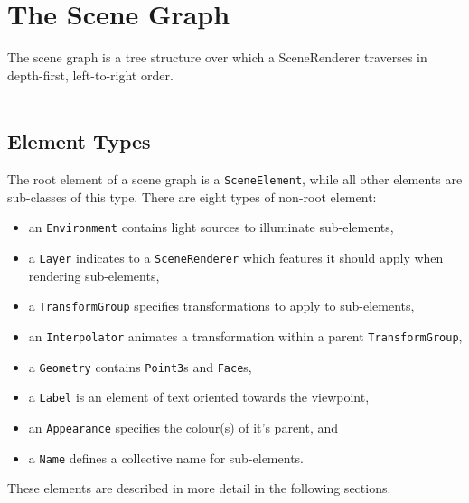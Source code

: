 \documentclass[10pt,aps, prb,preprint]{article}
\begin{document}
\newpage
\section{The Scene Graph}
The scene graph is a tree structure over which a SceneRenderer traverses in depth-first, left-to-right order.
\\
\\
\subsection{Element Types}
The root element of a scene graph is a \texttt{SceneElement}, while all other elements are sub-classes of this type. There are eight types of non-root element:
\begin{itemize}
\item an \texttt{Environment} contains light sources to illuminate sub-elements,
\item a \texttt{Layer} indicates to a \texttt{SceneRenderer} which features it should apply when rendering sub-elements,
\item a \texttt{TransformGroup} specifies transformations to apply to sub-elements,
\item an \texttt{Interpolator} animates a transformation within a parent \texttt{TransformGroup},
\item a \texttt{Geometry} contains \texttt{Point3}s and \texttt{Face}s,
\item a \texttt{Label} is an element of text oriented towards the viewpoint,
\item an \texttt{Appearance} specifies the colour(s) of it's parent, and
\item a \texttt{Name} defines a collective name for sub-elements.
\end{itemize}
These elements are described in more detail in the following sections.


\end{document}
